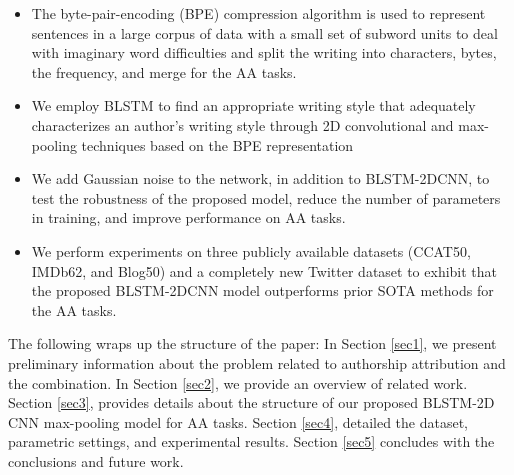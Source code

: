 \documentclass[conference]{IEEEtran}
\begin{document}
\begin{itemize}
    \item The byte-pair-encoding (BPE) compression algorithm is used to represent sentences in a large corpus of data with a small set of subword units to deal with imaginary word difficulties and split the writing into characters, bytes, the frequency, and merge for the AA tasks. 
    \item We employ BLSTM to find an appropriate writing style that adequately characterizes an author's writing style through 2D convolutional and max-pooling techniques based on the BPE representation
    \item We add Gaussian noise to the network, in addition to BLSTM-2DCNN, to test the robustness of the proposed model, reduce the number of parameters in training, and improve performance on AA tasks.
    \item We perform experiments on three publicly available datasets (CCAT50, IMDb62, and Blog50) and a completely new Twitter dataset to exhibit that the proposed BLSTM-2DCNN model outperforms prior SOTA methods for the AA tasks.
\end{itemize}
The following wraps up the structure of the paper: In Section \ref{sec1}, we present preliminary information about the problem related to authorship attribution and the combination. In Section \ref{sec2}, we provide an overview of related work. Section \ref{sec3}, provides details about the structure of our proposed BLSTM-2D CNN max-pooling model for AA tasks. Section \ref{sec4}, detailed the dataset, parametric settings, and experimental results. Section \ref{sec5} concludes with the conclusions and future work. 
\end{document}
